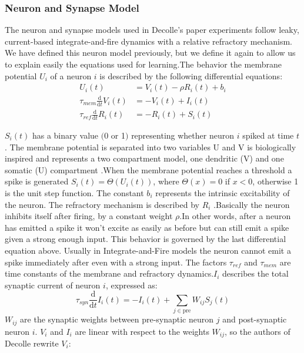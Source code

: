 \documentclass[12pt]{report}
\begin{document}
\subsubsection{Neuron and Synapse Model}
The neuron and synapse models used in Decolle's paper experiments follow leaky, current-based integrate-and-fire dynamics with a relative refractory mechanism. We have defined this neuron model previously, but we define it again to allow us to explain easily the equations used for learning.The behavior the membrane potential $U_{i}$ of a neuron $i$ is described by the following differential equations:
\begin{equation}
\begin{aligned}
U_{i}(t) &=V_{i}(t)-\rho R_{i}(t)+b_{i} \\
\tau_{m e m} \frac{\mathrm{d}}{\mathrm{d} t} V_{i}(t) &=-V_{i}(t)+I_{i}(t) \\
\tau_{r e f} \frac{\mathrm{d}}{\mathrm{d} t} R_{i}(t) &=-R_{i}(t)+S_{i}(t)
\end{aligned}
\end{equation}

$S_{i}(t)$ has a binary value $(0$ or 1$)$ representing whether neuron $i$ spiked at time $t$ . The membrane potential is separated into two variables U and V is biologically inspired and represents a two compartment model, one dendritic (V) and one somatic (U) compartment .When the membrane potential reaches a threshold a spike is generated 
$S_{i}(t)=\Theta\left(U_{i}(t)\right)$, where $\Theta(x)=0$ if $x<0$, otherwise 1 is the unit step function. The constant $b_{i}$ represents the intrinsic excitability of the neuron. The refractory mechanism is described by $R_{i}$ .Basically the neuron inhibits itself after firing, by a constant weight $\rho$.In other words, after a neuron has emitted a spike it won't excite as easily as before but can still emit a spike given a strong enough input. This behavior is governed by the last differential equation above. Usually in Integrate-and-Fire models the neuron cannot emit a spike immediately after even with a strong input. The factors $\tau_{r e f}$ and $\tau_{m e m}$ are time constants of the membrane and refractory dynamics.$I_{i}$ describes the total synaptic current of neuron $i$, expressed as:
\begin{equation}
\tau_{s y n} \frac{\mathrm{d}}{\mathrm{d} t} I_{i}(t)=-I_{i}(t)+\sum_{j \in \mathrm{pre}} W_{i j} S_{j}(t)
\end{equation}
$W_{i j}$ are the synaptic weights between pre-synaptic neuron $j$ and post-synaptic neuron $i$. $V_{i}$ and $I_{i}$ are linear with respect to the weights $W_{i j}$, so the authors of Decolle rewrite $V_{i}$:
\end{document}
